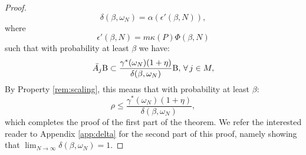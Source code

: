 \begin{proof}
$$\delta(\beta, \omega_N) =\alpha(\epsilon'(\beta,N)),$$
where
\begin{equation}\label{eqn:eps2}\epsilon'(\beta, N) = m\kappa(P)\Phi(\beta,N)\end{equation} such that with probability at least $\beta$ we have:
\begin{equation*}
\bar{A_j} \text{B} \subset \frac{\gamma^*(\omega_N)(1+\eta)}{\delta(\beta, \omega_N)}\text{B},\, \forall\, j \in M,
\end{equation*}
By Property \ref{rem:scaling}, this means that with probability at least $\beta$:
$$\rho \leq \frac{\gamma^*(\omega_N) (1 + \eta)}{\delta(\beta, \omega_N)},$$
which completes the proof of the first part of the theorem. We refer the interested reader to Appendix \ref{app:delta} for the second part of this proof, namely showing that $\lim_{N \to \infty}\delta(\beta, \omega_N) = 1$.



%
\end{proof}

